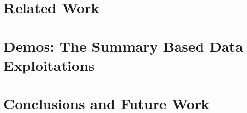 \documentclass{llncs}
\begin{document}
\section{Related Work}\label{sec:RelatedWork}




\vspace{-5mm}
\section{Demos: The Summary Based Data Exploitations }

%

\vspace{-5mm}
\section{Conclusions and Future Work}\label{sec:Conclusions}





%
\vspace{-5mm}





\clearpage
{} %
\renewcommand{\indexname}{Author Index}
\printindex \clearpage
{} %
\renewcommand{\indexname}{Subject Index}
%
\end{document}
